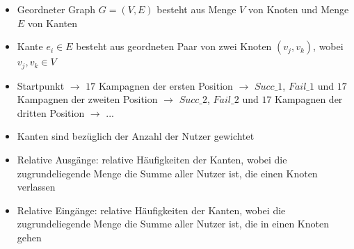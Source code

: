 \begin{frame}
	\begin{itemize}
		\item Geordneter Graph $G=(V,E)$ besteht aus Menge $V$ von Knoten und Menge $E$ von Kanten
		\item Kante $e_i \in E$ besteht aus geordneten Paar von zwei Knoten $(v_j,v_k)$, wobei $v_j,v_k \in V$
		\item Startpunkt $\rightarrow$ $17$ Kampagnen der ersten Position $\rightarrow$ $Succ\_1$, $Fail\_1$ und $17$ Kampagnen der zweiten Position $\rightarrow$ $Succ\_2$, $Fail\_2$ und $17$ Kampagnen der dritten Position $\rightarrow$ ...
		\item Kanten sind bezüglich der Anzahl der Nutzer gewichtet
		\item Relative Ausgänge: relative Häufigkeiten der Kanten, wobei die zugrundeliegende Menge die Summe aller Nutzer ist, die einen Knoten verlassen
		\item Relative Eingänge: relative Häufigkeiten der Kanten, wobei die zugrundeliegende Menge die Summe aller Nutzer ist, die in einen Knoten gehen
	\end{itemize}
\end{frame}

